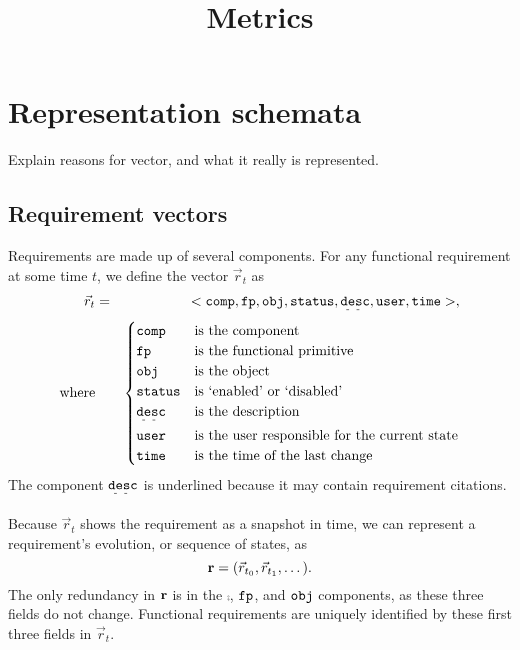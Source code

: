 \documentclass{article}
\title{Metrics}
\begin{document}
\maketitle

\tableofcontents



\section{Representation schemata}

Explain reasons for vector, and what it really is represented.

\subsection{Requirement vectors}

Requirements are made up of several components. For any functional
requirement at some time $t$, we define the vector $\vec{r}_t$ as
\begin{align}
\label{eq:def_of_rt}
\vec{r}_t &=& <\comp,\fp,\obj,\status,\desc,\user,\ctime>,\\
\text{where} && \begin{cases}
  \comp     & \text{is the component}\\
  \fp       & \text{is the functional primitive}\\
  \obj      & \text{is the object}\\
  \status   & \text{is `enabled' or `disabled'}\\
  \desc     & \text{is the description}\\
  \user     & \text{is the user responsible for the current state}\\
  \ctime    & \text{is the time of the last change}
  \end{cases} \notag
\end{align}
The component $\desc$ is underlined because it may contain requirement
citations.

Because $\vec{r}_t$ shows the requirement as a snapshot in time, we
can represent a requirement's evolution, or sequence of states, as
\begin{equation}
\label{eq:def_of_r}
\mathbf{r} = (\vec{r}_{t_0}, \vec{r}_{t_1}, \dots).
\end{equation}
The only redundancy in $\mathbf{r}$ is in the $\comp$, $\mathtt{fp}$, and $\mathtt{obj}$
components, as these three fields do not change. Functional requirements
are uniquely identified by these first three fields in $\vec{r}_t$.
\end{document}
